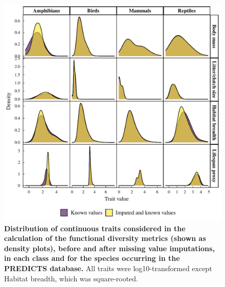 \begin{figure}[h!]
\centering
\includegraphics[scale=0.8]{Supporting/Chapter3/Figures/SI_dist_cont}
\caption[Distribution of continuous traits considered in the calculation of the functional diversity metrics]{\textbf{Distribution of continuous traits considered in the calculation of the functional diversity metrics (shown as density plots), before and after missing value imputations, in each class and for the species occurring in the PREDICTS database.} All traits were log10-transformed except Habitat breadth, which was square-rooted.}
\label{}
\end{figure}

